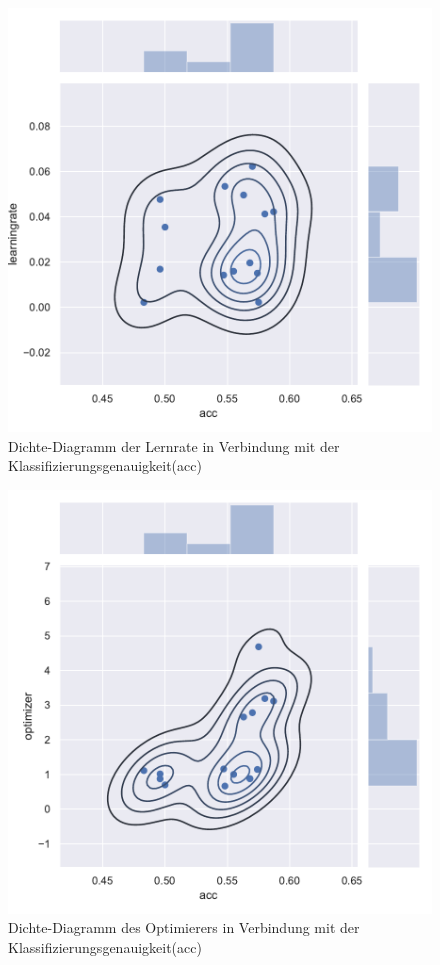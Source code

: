 \begin{figure}[H]
  \centering  
  \includegraphics[scale=0.5]{anhang/GA_50_cifar10_True_big_jointplot_learningrate.pdf}
  \caption{Dichte-Diagramm der Lernrate in Verbindung mit der Klassifizierungsgenauigkeit(acc)}
  
\end{figure}

\begin{figure}[H]
  \centering  
  \includegraphics[scale=0.5]{anhang/GA_50_cifar10_True_big_jointplot_optimizer.pdf}
  \caption{Dichte-Diagramm des Optimierers in Verbindung mit der Klassifizierungsgenauigkeit(acc)}
  
\end{figure}

